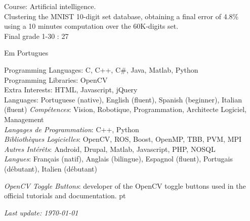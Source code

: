 \documentclass{article}
\begin{document}
\begin{llist}
{ 
Course: Artificial intelligence.\\
Clustering the MNIST 10-digit set database, obtaining a final error of 4.8\%\\
using a 10 minutes computation over the 60K-digits set.\\
Final grade 1-30 : 27

}
{

Em Portugues

}

{
Programming Languages: C, C++, C\#, Java, Matlab, Python\\
Programming Libraries: OpenCV \\
Extra Interests: HTML, Javascript, jQuery \\
Languages: Portuguese (native), English (fluent), Spanish (beginner), Italian (fluent)
}
{
{\em Comp\'{e}tences}: Vision, Robotique, Programmation, Architecte Logiciel, Management\\
{\em Langages de Programmation}: C++, Python\\
{\em Biblioth\`{e}ques Logicielles}: OpenCV, ROS, Boost, OpenMP, TBB, PVM, MPI \\
{\em Autres Int\'{e}r\^{e}ts}: Android, Drupal, Matlab, Javascript, PHP, NOSQL \\
{\em Langues}: Fran\c{c}ais (natif), Anglais (bilingue), Espagnol (fluent), Portugais (d\'{e}butant), Italien
(d\'{e}butant)
}

{
{\em OpenCV Toggle Buttons}: developer of the OpenCV toggle buttons used in the official tutorials and documentation.
}
{
pt
}




\end{llist}

{\em Last update: \today}
\end{document}
